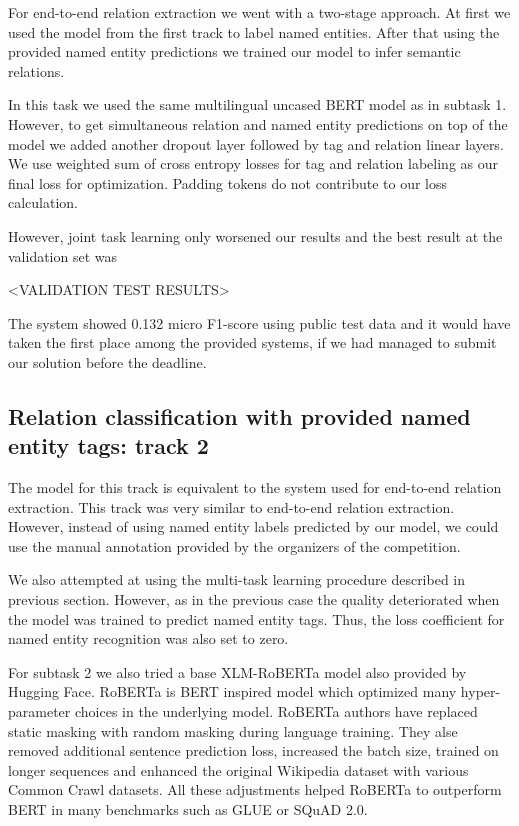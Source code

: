 \documentclass{dialogue}
\begin{document}
For end-to-end relation extraction we went with a two-stage approach. At first we used the model from the first track to label named entities. After that using the provided named entity predictions we trained our model to infer semantic relations.

In this task we used the same multilingual uncased BERT model as in subtask 1. However, to get simultaneous relation and named entity predictions on top of the model we added another dropout layer followed by tag and relation linear layers. We use weighted sum of cross entropy losses for tag and relation labeling as our final loss for optimization. Padding tokens do not contribute to our loss calculation.

However, joint task learning only worsened our results and the best result at the validation set was

<VALIDATION TEST RESULTS>

The system showed 0.132 micro F1-score using public test data and it would have taken the first place among the provided systems, if we had managed to submit our solution before the deadline.
\subsection{Relation classification with provided named entity tags: track 2}
The model for this track is equivalent to the system used for end-to-end relation extraction. This track was very similar to end-to-end relation extraction. However, instead of using named entity labels predicted by our model, we could use the manual annotation provided by the organizers of the competition.

We also attempted at using the multi-task learning procedure described in previous section. However, as in the previous case the quality deteriorated when the model was trained to predict named entity tags. Thus, the loss coefficient for named entity recognition was also set to zero.

For subtask 2 we also tried a base XLM-RoBERTa \cite{roberta} model also provided by Hugging Face. RoBERTa is BERT inspired model which optimized many hyper-parameter choices in the underlying model. RoBERTa authors have replaced static masking with random masking during language training. They alse removed additional sentence prediction loss, increased the batch size, trained on longer sequences and enhanced the original Wikipedia dataset with various Common Crawl datasets. All these adjustments helped RoBERTa to outperform BERT in many benchmarks such as GLUE or SQuAD 2.0.
\end{document}
